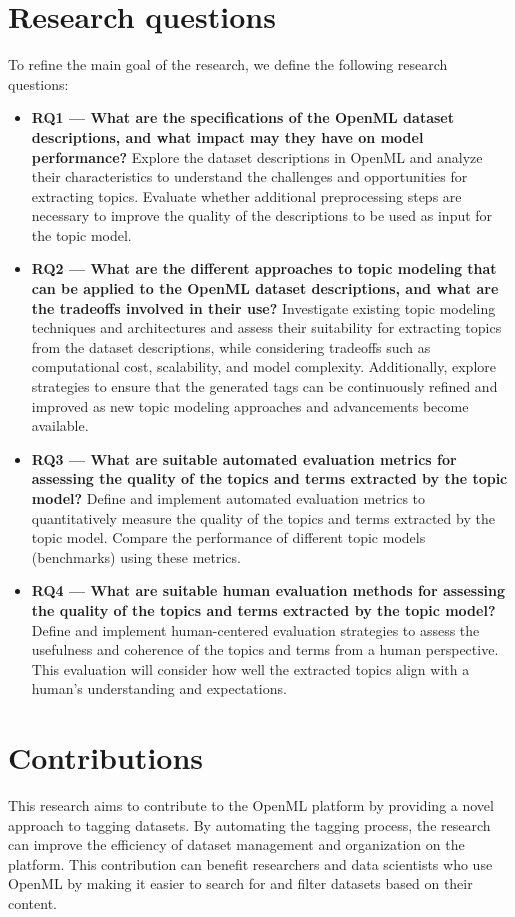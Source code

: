 \section{Research questions}
To refine the main goal of the research, we define the following research questions:
\begin{itemize}
    \item{\textbf{RQ1 — What are the specifications of the OpenML dataset descriptions, and what impact may they have on model performance?}}\label{rq1} Explore the dataset descriptions in OpenML and analyze their characteristics to understand the challenges and opportunities for extracting topics. Evaluate whether additional preprocessing steps are necessary to improve the quality of the descriptions to be used as input for the topic model.
    \item{\textbf{RQ2 — What are the different approaches to topic modeling that can be applied to the OpenML dataset descriptions, and what are the tradeoffs involved in their use?}}\label{rq2} Investigate existing topic modeling techniques and architectures and assess their suitability for extracting topics from the dataset descriptions, while considering tradeoffs such as computational cost, scalability, and model complexity. Additionally, explore strategies to ensure that the generated tags can be continuously refined and improved as new topic modeling approaches and advancements become available.
    \item{\textbf{RQ3 — What are suitable automated evaluation metrics for assessing the quality of the topics and terms extracted by the topic model?}}\label{rq3} Define and implement automated evaluation metrics to quantitatively measure the quality of the topics and terms extracted by the topic model. Compare the performance of different topic models (benchmarks) using these metrics.
    \item{\textbf{RQ4 — What are suitable human evaluation methods for assessing the quality of the topics and terms extracted by the topic model?}}\label{rq4} Define and implement human-centered evaluation strategies to assess the usefulness and coherence of the topics and terms from a human perspective. This evaluation will consider how well the extracted topics align with a human's understanding and expectations.
\end{itemize}

\section{Contributions}
This research aims to contribute to the OpenML platform by providing a novel approach to tagging datasets. By automating the tagging process, the research can improve the efficiency of dataset management and organization on the platform. This contribution can benefit researchers and data scientists who use OpenML by making it easier to search for and filter datasets based on their content.


